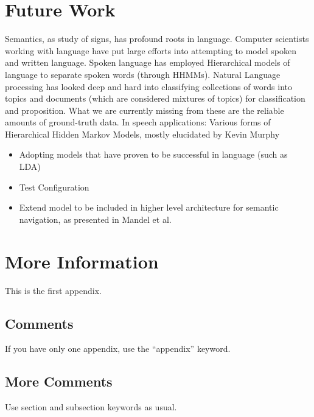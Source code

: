 \documentclass[twocolumn,letterpaper]{IEEEAerospaceCLS}  %
\begin{document}
\section{Future Work} \label{sec:Fut}
Semantics, as study of signs, has profound roots in language. Computer scientists working with language have put large efforts into attempting to model spoken and written language. Spoken language has employed Hierarchical models of language to separate spoken words (through HHMMs). Natural Language processing has looked deep and hard into classifying collections of words into topics and documents (which are considered mixtures of topics) for classification and proposition.
What we are currently missing from these are the reliable amounts of ground-truth data. In speech applications: Various forms of Hierarchical Hidden Markov Models, mostly elucidated by Kevin Murphy~\cite{murphy_dynamic_2002}
\begin{itemize}
    \item Adopting models that have proven to be successful in language (such as LDA)
    \item Test Configuration
    \item Extend model to be included in higher level architecture for semantic navigation, as presented in Mandel et al.~\cite{mandel_towards_2020}
\end{itemize}
\appendices{}              %

\section{More Information}        %
This is the first appendix.

\subsection{Comments}
If you have only one appendix, use the ``appendix'' keyword.

\subsection{More Comments}
Use section and subsection keywords as usual.
\end{document}
